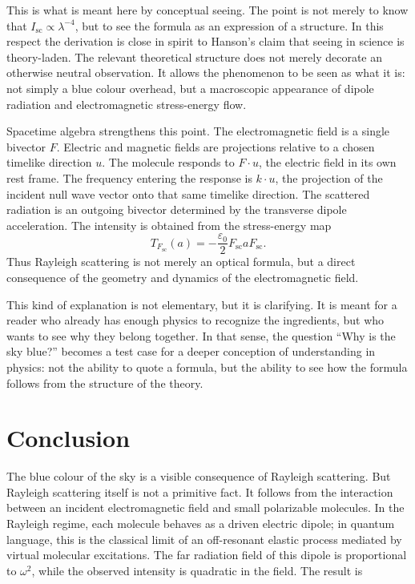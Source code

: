 \documentclass[11pt,a4paper]{article}
\begin{document}
This is what is meant here by conceptual seeing. The point is not merely to
know that \(I_{\mathrm{sc}}\propto\lambda^{-4}\), but to see the formula as
an expression of a structure. In this respect the derivation is close in
spirit to Hanson's claim that seeing in science is theory-laden. The relevant
theoretical structure does not merely decorate an otherwise neutral
observation. It allows the phenomenon to be seen as what it is: not simply a
blue colour overhead, but a macroscopic appearance of dipole radiation and
electromagnetic stress-energy flow.

Spacetime algebra strengthens this point. The electromagnetic field is a
single bivector \(F\). Electric and magnetic fields are projections relative
to a chosen timelike direction \(u\). The molecule responds to \(F\cdot u\),
the electric field in its own rest frame. The frequency entering the response
is \(k\cdot u\), the projection of the incident null wave vector onto that
same timelike direction. The scattered radiation is an outgoing bivector
determined by the transverse dipole acceleration. The intensity is obtained
from the stress-energy map
\[
T_{F_{\mathrm{sc}}}(a)
=
-\frac{\varepsilon_0}{2}F_{\mathrm{sc}}aF_{\mathrm{sc}}.
\]
Thus Rayleigh scattering is not merely an optical formula, but a direct
consequence of the geometry and dynamics of the electromagnetic field.

This kind of explanation is not elementary, but it is clarifying. It is meant
for a reader who already has enough physics to recognize the ingredients, but
who wants to see why they belong together. In that sense, the question
``Why is the sky blue?'' becomes a test case for a deeper conception of
understanding in physics: not the ability to quote a formula, but the ability
to see how the formula follows from the structure of the theory.

\section{Conclusion}

The blue colour of the sky is a visible consequence of Rayleigh scattering.
But Rayleigh scattering itself is not a primitive fact. It follows from the
interaction between an incident electromagnetic field and small polarizable
molecules. In the Rayleigh regime, each molecule behaves as a driven electric
dipole; in quantum language, this is the classical limit of an off-resonant
elastic process mediated by virtual molecular excitations. The far radiation
field of this dipole is proportional to \(\omega^2\), while the observed
intensity is quadratic in the field. The result is
\end{document}
